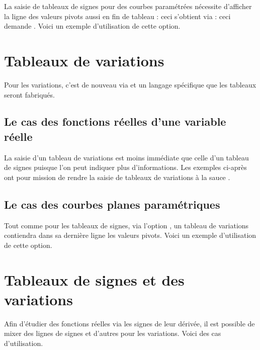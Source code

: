 La saisie de tableaux de signes pour des courbes paramétrées nécessite d'afficher la ligne des valeurs pivots aussi en fin de tableau : ceci s'obtient via  : ceci demande . Voici un exemple d'utilisation de cette option.


\section{Tableaux de variations}

\begin{tdocnote}
	Pour les variations, c'est de nouveau via  et un langage spécifique que les tableaux seront fabriqués.
\end{tdocnote}




\subsection{Le cas des fonctions réelles d'une variable réelle}

La saisie d'un tableau de variations est moins immédiate que celle d'un tableau de signes puisque l'on peut indiquer plus d'informations. Les exemples ci-après ont pour mission de rendre  la saisie de tableaux de variations à la sauce \thispack.



\subsection{Le cas des courbes planes paramétriques}

Tout comme pour les tableaux de signes, via l'option , un tableau de variations contiendra dans sa dernière ligne les valeurs pivots. Voici un exemple d'utilisation de cette option.


\section{Tableaux de signes et des variations}

Afin d'étudier des fonctions réelles via les signes de leur dérivée, il est possible de mixer des lignes de signes et d'autres pour les variations. Voici des cas d'utilisation.



